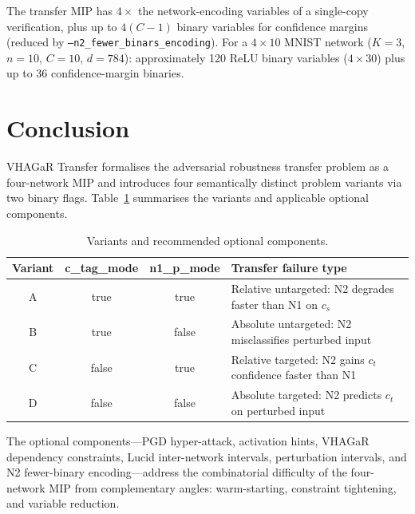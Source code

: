 \documentclass[11pt,a4paper]{article}
\theoremstyle{definition}
\theoremstyle{plain}
\begin{document}
The transfer MIP has $4\times$ the network-encoding variables of a single-copy verification, plus up to $4(C-1)$ binary variables for confidence margins (reduced by \texttt{--n2\_fewer\_binars\_encoding}). For a $4\times 10$ MNIST network ($K=3$, $n=10$, $C=10$, $d=784$): approximately 120 ReLU binary variables ($4 \times 30$) plus up to 36 confidence-margin binaries.

\section{Conclusion}

VHAGaR Transfer formalises the adversarial robustness transfer problem as a four-network MIP and introduces four semantically distinct problem variants via two binary flags. Table~\ref{tab:conclusion} summarises the variants and applicable optional components.

\begin{table}[h]
\centering
\caption{Variants and recommended optional components.}
\label{tab:conclusion}
\begin{tabular}{cccl}
\toprule
\textbf{Variant} & \textbf{c\_tag\_mode} & \textbf{n1\_p\_mode} & \textbf{Transfer failure type} \\
\midrule
A & true  & true  & Relative untargeted: N2 degrades faster than N1 on $c_s$ \\
B & true  & false & Absolute untargeted: N2 misclassifies perturbed input \\
C & false & true  & Relative targeted: N2 gains $c_t$ confidence faster than N1 \\
D & false & false & Absolute targeted: N2 predicts $c_t$ on perturbed input \\
\bottomrule
\end{tabular}
\end{table}

The optional components---PGD hyper-attack, activation hints, VHAGaR dependency constraints, Lucid inter-network intervals, perturbation intervals, and N2 fewer-binary encoding---address the combinatorial difficulty of the four-network MIP from complementary angles: warm-starting, constraint tightening, and variable reduction.
\end{document}
